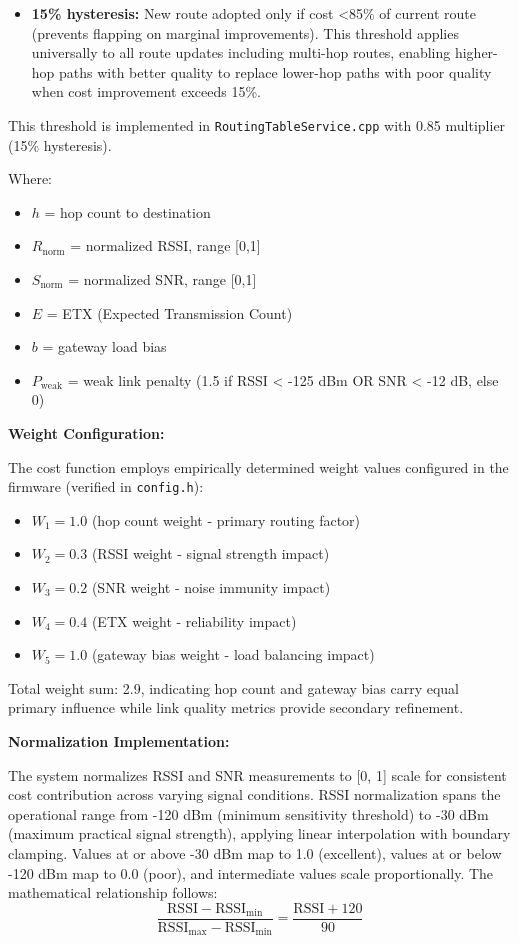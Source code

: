 \begin{itemize}
\item \textbf{15\% hysteresis:} New route adopted only if cost <85\% of current route (prevents flapping on marginal improvements). This threshold applies universally to all route updates including multi-hop routes, enabling higher-hop paths with better quality to replace lower-hop paths with poor quality when cost improvement exceeds 15\%.
\end{itemize}

This threshold is implemented in \texttt{RoutingTableService.cpp} with 0.85 multiplier (15\% hysteresis).

Where:
\begin{itemize}
\item $h$ = hop count to destination
\item $R_{\text{norm}}$ = normalized RSSI, range [0,1]
\item $S_{\text{norm}}$ = normalized SNR, range [0,1]
\item $E$ = ETX (Expected Transmission Count)
\item $b$ = gateway load bias
\item $P_{\text{weak}}$ = weak link penalty (1.5 if RSSI < -125 dBm OR SNR < -12 dB, else 0)
\end{itemize}

\textbf{Weight Configuration:}

The cost function employs empirically determined weight values configured in the firmware (verified in \texttt{config.h}):

\begin{itemize}
\item $W_1 = 1.0$ (hop count weight - primary routing factor)
\item $W_2 = 0.3$ (RSSI weight - signal strength impact)
\item $W_3 = 0.2$ (SNR weight - noise immunity impact)
\item $W_4 = 0.4$ (ETX weight - reliability impact)
\item $W_5 = 1.0$ (gateway bias weight - load balancing impact)
\end{itemize}

Total weight sum: 2.9, indicating hop count and gateway bias carry equal primary influence while link quality metrics provide secondary refinement.

\textbf{Normalization Implementation:}

The system normalizes RSSI and SNR measurements to [0, 1] scale for consistent cost contribution across varying signal conditions. RSSI normalization spans the operational range from -120 dBm (minimum sensitivity threshold) to -30 dBm (maximum practical signal strength), applying linear interpolation with boundary clamping. Values at or above -30 dBm map to 1.0 (excellent), values at or below -120 dBm map to 0.0 (poor), and intermediate values scale proportionally. The mathematical relationship follows:
\begin{equation}
\frac{\text{RSSI} - \text{RSSI}_{\min}}{\text{RSSI}_{\max} - \text{RSSI}_{\min}} = \frac{\text{RSSI} + 120}{90}
\end{equation}

